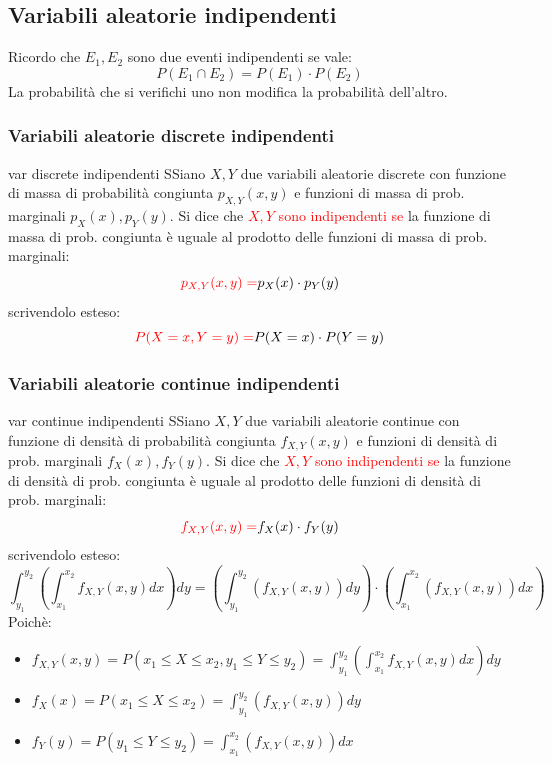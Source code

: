 \documentclass{article}  %
\theoremstyle{definition}
\begin{document}
\subsection{Variabili aleatorie indipendenti}
Ricordo che $E_1,E_2$ sono due eventi indipendenti se vale:
\[
	P(E_1 \cap E_2)=P(E_1) \cdot P(E_2)
\]
La probabilità che si verifichi uno non modifica la probabilità dell'altro.
\subsubsection{Variabili aleatorie discrete indipendenti}
\begin{theorem}{var discrete indipendenti}
	SSiano $X,Y$ due variabili aleatorie discrete con funzione di massa di probabilità congiunta $p_{X,Y}(x,y)$ e funzioni di massa di prob. marginali $p_X(x),p_Y(y)$.
	Si dice che \textcolor{red}{$X,Y$ sono indipendenti se} la funzione di massa di prob. congiunta è uguale al prodotto delle funzioni di massa di prob. marginali:
	\[
		\textcolor{red}{p_{X,Y}(x,y)= } p_X(x) \cdot p_Y(y)
	\]
	scrivendolo esteso:
	\[
		\textcolor{red}{P(X=x,Y=y)=}P(X=x) \cdot P(Y=y)
	\]
\end{theorem}
\subsubsection{Variabili aleatorie continue indipendenti}
\begin{theorem}{var continue indipendenti}
	SSiano $X,Y$ due variabili aleatorie continue con funzione di densità di probabilità congiunta $f_{X,Y}(x,y)$ e funzioni di densità di prob. marginali $f_X(x),f_Y(y)$.
	Si dice che \textcolor{red}{$X,Y$ sono indipendenti se} la funzione di densità di prob. congiunta è uguale al prodotto delle funzioni di densità di prob. marginali:
	\[
		\textcolor{red}{f_{X,Y}(x,y)= } f_X(x) \cdot f_Y(y)
	\]
	scrivendolo esteso:
	\[
		\int_{y_1}^{y_2}\left(\int_{x_1}^{x_2}f_{X,Y}(x,y) dx\right)dy=\left(\int_{y_1}^{y_2}(f_{X,Y}(x,y))dy \right) \cdot \left(\int_{x_1}^{x_2}(f_{X,Y}(x,y))dx \right)
	\]
	Poichè:
	\begin{itemize}
		\item $f_{X,Y}(x,y)=P(x_1 \leq X \leq x_2 , y_1 \leq Y \leq y_2)=\int_{y_1}^{y_2}\left(\int_{x_1}^{x_2}f_{X,Y}(x,y) dx\right)dy$
		\item $f_X(x)=P(x_1 \leq X \leq x_2)=\int_{y_1}^{y_2}(f_{X,Y}(x,y))dy$
		\item $f_{Y}(y)=P(y_1 \leq Y \leq y_2)=\int_{x_1}^{x_2}(f_{X,Y}(x,y))dx$
	\end{itemize}
\end{theorem}
\end{document}
